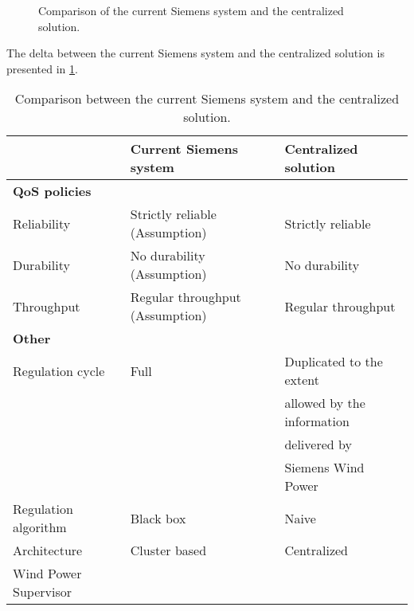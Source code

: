 \begin{figure}
	\centering
	
	\caption[Comparison of the current Siemens system and the centralized solution]{
		\label{fig:projectDiffOverviewCentralizedSiemens}
		\footnotesize{%
			Comparison of the current Siemens system and the centralized solution.
		}
	}
\end{figure}

\FloatBarrier

The delta between the current Siemens system and the centralized solution is presented in \cref{tab:centralizedVSsiemens}.

\begin{table}
	\begin{tabular}{l l l}
		\hline
		\hline
		~ & \textbf{Current Siemens system} & \textbf{Centralized solution} \\
		\hline
		\hline
		\multicolumn{3}{l}{\textbf{QoS policies}} \\
		\hline
		Reliability & Strictly reliable (Assumption) & Strictly reliable \\
		\hline
		Durability & No durability (Assumption) & No durability \\
		\hline
		Throughput & Regular throughput (Assumption) & Regular throughput \\
		\hline
		\hline
		\multicolumn{3}{l}{\textbf{Other}} \\
		\hline
		\hline
		Regulation cycle & Full & Duplicated to the extent\\
		~ & ~ & allowed by the information\\
		~ & ~ & delivered by\\
		~ & ~ & Siemens Wind Power\\
		\hline
		Regulation algorithm & Black box & Naive \\
		\hline
		Architecture & Cluster based & Centralized \\
		\hline
		Wind Power Supervisor & \checkmark & \text{x} \\
		\hline
		\hline
	\end{tabular}
	
	\caption[Comparison between the current Siemens system and the centralized solution]{
		\label{tab:centralizedVSsiemens}
		\footnotesize{%
			Comparison between the current Siemens system and the centralized solution.
		} 
	}
\end{table}

